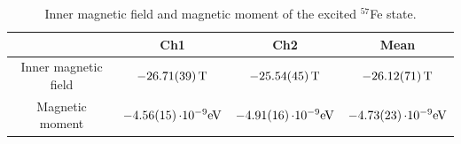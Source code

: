 \begin{table}
    \centering
    \caption{Inner magnetic field and magnetic moment of the excited $^{57}$Fe state.}

    \begin{tabular}{c c c c}
     \toprule
     &Ch1&Ch2&Mean \\
     \hline
     Inner magnetic field &  $-\SI{26.71\pm 0.39}{T}$ &$-\SI{25.54\pm 0.45}{T}$   &$-\SI{26.12\pm 0.71}{T}$ \\
     Magnetic moment& $-\SI{4.56\pm 0.15}{\cdot 10^{-9}eV}$  &$-\SI{4.91\pm 0.16}{\cdot 10^{-9}eV}$   &$-\SI{4.73\pm 0.23}{\cdot 10^{-9}eV}$\\
     \bottomrule
    \end{tabular}

    \label{tab:fe2}
\end{table}
